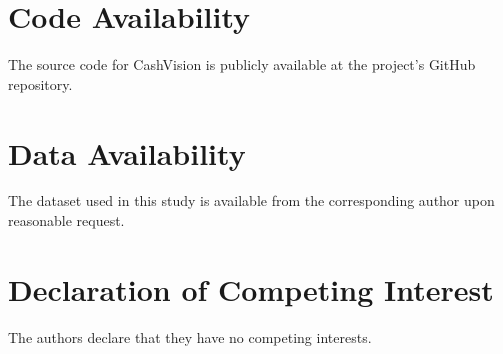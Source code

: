\documentclass[final,5p,times,twocolumn,authoryear]{elsarticle}
\begin{document}
\section*{Code Availability}
The source code for CashVision is publicly available at the project's GitHub repository.

\section*{Data Availability}
The dataset used in this study is available from the corresponding author upon reasonable request.

\section*{Declaration of Competing Interest}
The authors declare that they have no competing interests.
 

\end{document}
